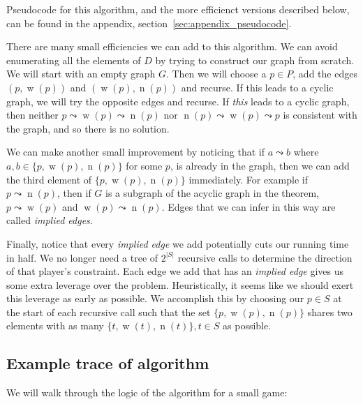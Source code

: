 \documentclass[12pt,x11names, rgb]{article}
\DeclareMathOperator{\w}{w}
\DeclareMathOperator{\n}{n}
\begin{document}
    Pseudocode for this algorithm, and the more efficienct versions described below, can be found in the appendix, section~\ref{sec:appendix_pseudocode}.
 
    There are many small efficiencies we can add to this algorithm. We can avoid enumerating all the elements of $D$ by trying to construct our graph from scratch. We will start with an empty graph $G$. Then we will choose a $p \in P$, add the edges $(p,\w(p))$ and $(\w(p),\n(p))$ and recurse. If this leads to a cyclic graph, we will try the opposite edges and recurse. If \emph{this} leads to a cyclic graph, then neither $p \leadsto \w(p) \leadsto \n(p)$ nor $\n(p) \leadsto \w(p) \leadsto p$ is consistent with the graph, and so there is no solution.

    We can make another small improvement by noticing that if $a \leadsto b$ where $a,b \in \{p, \w(p), \n(p)\}$ for some $p$, is already in the graph, then we can add the third element of $\{p, \w(p), \n(p)\}$ immediately. For example if $p \leadsto \n(p)$, then if $G$ is a subgraph of the acyclic graph in the theorem, $p \leadsto \w(p)$ and $\w(p) \leadsto \n(p)$. Edges that we can infer in this way are called \emph{implied edges}.

    Finally, notice that every \emph{implied edge} we add potentially cuts our running time in half. We no longer need a tree of $2^{\lvert S \rvert}$ recursive calls to determine the direction of that player's constraint. Each edge we add that has an \emph{implied edge} gives us some extra leverage over the problem. Heuristically, it seems like we should exert this leverage as early as possible. We accomplish this by choosing our $p\in S$ at the start of each recursive call such that the set $\{p,\w(p), \n(p)\}$ shares two elements with as many $\{t, \w(t), \n(t)\}, t\in S$ as possible. 


\subsection{Example trace of algorithm}
\label{sec:alg-example}
    We will walk through the logic of the algorithm for a small game:
\end{document}
